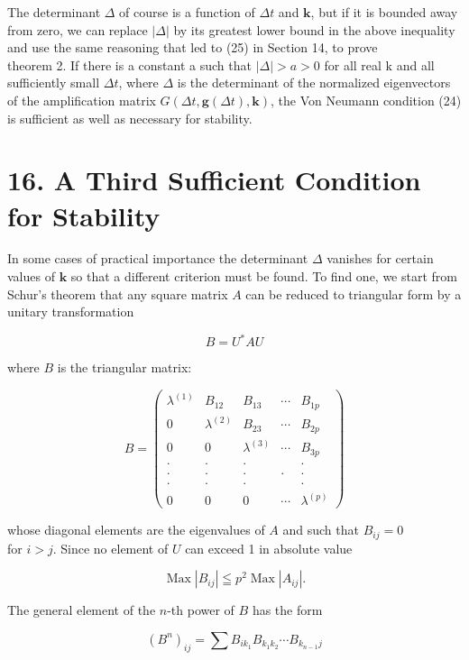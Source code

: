 \documentclass[10pt]{article}
\begin{document}
The determinant \(\Delta\) of course is a function of \(\Delta t\) and \(\mathbf{k}\), but if it is bounded away from zero, we can replace \(|\Delta|\) by its greatest lower bound in the above inequality and use the same reasoning that led to (25) in Section 14, to prove\\
theorem 2. If there is a constant a such that \(|\Delta|>a>0\) for all real \(\mathbf{\mathrm { k }}\) and all sufficiently small \(\Delta t\), where \(\Delta\) is the determinant of the normalized eigenvectors of the amplification matrix \(G(\Delta t, \mathbf{g}(\Delta t), \mathbf{k})\), the Von Neumann condition (24) is sufficient as well as necessary for stability.

\section*{16. A Third Sufficient Condition for Stability}
In some cases of practical importance the determinant \(\Delta\) vanishes for certain values of \(\mathbf{k}\) so that a different criterion must be found. To find one, we start from Schur's theorem that any square matrix \(A\) can be reduced to triangular form by a unitary transformation

\[
B=U^{*} A U
\]

where \(B\) is the triangular matrix:

\[
B=\left(\begin{array}{lllll}
\lambda^{(1)} & B_{12} & B_{13} & \cdots & B_{1 p} \\
0 & \lambda^{(2)} & B_{23} & \cdots & B_{2 p} \\
0 & 0 & \lambda^{(3)} & \cdots & B_{3 p} \\
\cdot & \cdot & \cdot & & \cdot \\
\cdot & \cdot & \cdot & \cdot & \cdot \\
\cdot & \cdot & \cdot & & \cdot \\
0 & 0 & 0 & \cdots & \lambda^{(p)}
\end{array}\right)
\]

whose diagonal elements are the eigenvalues of \(A\) and such that \(B_{i j}=0\)\\
for \(i>j\). Since no element of \(U\) can exceed 1 in absolute value

\[
\operatorname{Max}\left|B_{i j}\right| \leqq p^{2} \operatorname{Max}\left|A_{i j}\right| .
\]

The general element of the \(n\)-th power of \(B\) has the form

\[
\left(B^{n}\right)_{i j}=\sum B_{i k_{1}} B_{k_{1} k_{2}} \cdots B_{k_{n-1} j}
\]
\end{document}
